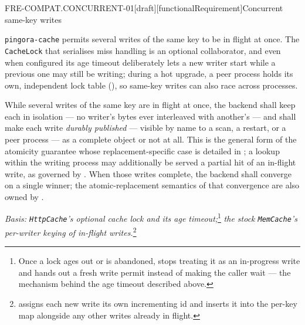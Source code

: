 \begin{requirement}{FRE-COMPAT.CONCURRENT-01}[draft][functionalRequirement]{Concurrent same-key writes}


  \texttt{pingora-cache} permits several writes of the same key to be in
  flight at once. The \texttt{CacheLock} that serialises miss handling is an
  optional collaborator, and even when configured its age timeout deliberately
  lets a new writer start while a previous one may still be writing; during a
  hot upgrade, a peer process holds its own, independent lock table
  (), so same-key writes can also race
  across processes.

  While several writes of the same key are in flight at once, the backend
  shall keep each in isolation --- no writer's bytes ever interleaved with
  another's --- and shall make each write \emph{durably published} ---
  visible by name to a scan, a restart, or a peer process --- as a complete
  object or not at all. This is the general form of the atomicity guarantee
  whose replacement-specific case is detailed in
  ; a lookup within the writing process
  may additionally be served a partial hit of an in-flight write, as
  governed by .
  When those writes complete, the backend shall converge on a single winner;
  the atomic-replacement semantics of that convergence are also owned by
  .

  \textit{Basis: \texttt{HttpCache}'s optional cache lock and its age
  timeout;}\footnote{Once a lock ages out or is abandoned,
   stops
  treating it as an in-progress write and hands out a fresh write permit
  instead of making the caller wait --- the mechanism behind the age timeout
  described above.} \textit{the stock \texttt{MemCache}'s per-writer keying
  of in-flight
  writes.}\footnote{
  assigns each new write its own incrementing id and inserts it into the
  per-key map alongside any other writes already in flight.}



\end{requirement}

